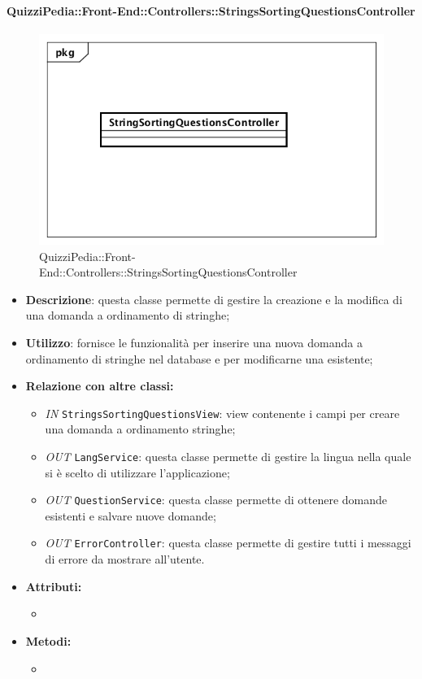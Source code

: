 \paragraph{QuizziPedia::Front-End::Controllers::StringsSortingQuestionsController}
\begin{figure}
	\centering
	\includegraphics[scale=0.45]{UML/Classi/Front-End/QuizziPedia_Front-end_Controller_StringSortingQuestionsController.png}
	\caption{QuizziPedia::Front-End::Controllers::StringsSortingQuestionsController}
\end{figure}
\begin{itemize}
	\item \textbf{Descrizione}: questa classe permette di gestire la creazione e la modifica di una domanda a ordinamento di stringhe;
	\item \textbf{Utilizzo}: fornisce le funzionalità per inserire una nuova domanda a ordinamento di stringhe nel database e per modificarne una esistente;
	\item \textbf{Relazione con altre classi:}
	\begin{itemize}
		\item \textit{IN} \texttt{StringsSortingQuestionsView}: view contenente i campi per creare una domanda a ordinamento stringhe; 
		\item \textit{OUT} \texttt{LangService}: questa classe permette di gestire la lingua nella quale si è scelto di utilizzare l'applicazione;
		\item \textit{OUT} \texttt{QuestionService}: questa classe permette di ottenere domande esistenti e salvare nuove domande;
		\item \textit{OUT} \texttt{ErrorController}: questa classe permette di gestire tutti i messaggi di errore da mostrare all'utente.
	\end{itemize}
	\item \textbf{Attributi:}
	\begin{itemize}
		\item 
	\end{itemize}
	\item \textbf{Metodi:}
	\begin{itemize}
		\item 
	\end{itemize}
\end{itemize}

